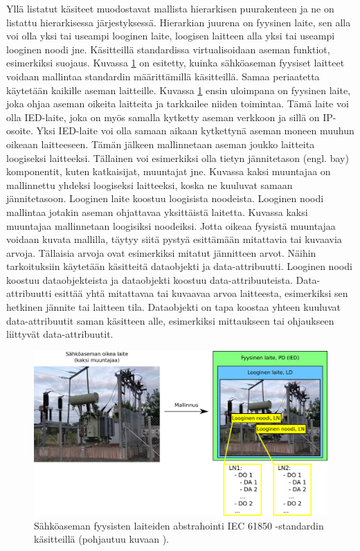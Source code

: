 Yllä listatut käsiteet muodostavat mallista hierarkisen puurakenteen ja ne on listattu hierarkisessa järjestyksessä. Hierarkian juurena on fyysinen laite, sen alla voi olla yksi tai useampi looginen laite, loogisen laitteen alla yksi tai useampi looginen noodi jne. Käsitteillä standardissa virtualisoidaan aseman funktiot, esimerkiksi suojaus. Kuvassa \ref{fig:substation-abstraction} on esitetty, kuinka sähköaseman fyysiset laitteet voidaan mallintaa standardin määrittämillä käsitteillä. Samaa periaatetta käytetään kaikille aseman laitteille. Kuvassa \ref{fig:substation-abstraction} ensin uloimpana on fyysinen laite, joka ohjaa aseman oikeita laitteita ja tarkkailee niiden toimintaa. Tämä laite voi olla IED-laite, joka on myös samalla kytketty aseman verkkoon ja sillä on IP-osoite. Yksi IED-laite voi olla samaan aikaan kytkettynä aseman moneen muuhun oikeaan laitteeseen. Tämän jälkeen mallinnetaan aseman joukko laitteita loogiseksi laitteeksi. Tällainen voi esimerkiksi olla tietyn jännitetason (engl. bay) komponentit, kuten katkaisijat, muuntajat jne. Kuvassa kaksi muuntajaa on mallinnettu yhdeksi loogiseksi laitteeksi, koska ne kuuluvat samaan jännitetasoon. Looginen laite koostuu loogisista noodeista. Looginen noodi mallintaa jotakin aseman ohjattavaa yksittäistä laitetta. Kuvassa kaksi muuntajaa mallinnetaan loogisiksi noodeiksi. Jotta oikeaa fyysistä muuntajaa voidaan kuvata mallilla, täytyy siitä pystyä esittämään mitattavia tai kuvaavia arvoja. Tällaisia arvoja ovat esimerkiksi mitatut jännitteen arvot. Näihin tarkoituksiin käytetään käsitteitä dataobjekti ja data-attribuutti. Looginen noodi koostuu dataobjekteista ja dataobjekti koostuu data-attribuuteista. Data-attribuutti esittää yhtä mitattavaa tai kuvaavaa arvoa laitteesta, esimerkiksi sen hetkinen jännite tai laitteen tila. Dataobjekti on tapa koostaa yhteen kuuluvat data-attribuutit saman käsitteen alle, esimerkiksi mittaukseen tai ohjaukseen liittyvät data-attribuutit. \mbox{\cite[s.~2]{Camachi2017}} \mbox{\cite[s.~24]{IEC61850-1}}

\begin{figure}[ht!]
	\includegraphics[width=1\textwidth]{pictures/substation-abstraction.png}
	\caption{Sähköaseman fyysisten laiteiden abstrahointi IEC 61850 -standardin käsitteillä (pohjautuu kuvaan \mbox{\cite[s.~17]{IEC61850-7-1}}).}
	\label{fig:substation-abstraction}
\end{figure}


